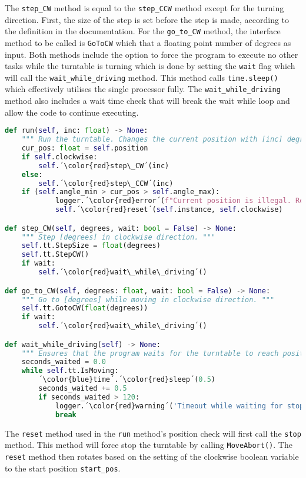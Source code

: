 The \verb+step_CW+ method is equal to the \verb+step_CCW+ method except for the turning direction. First, the size of the step is set before the step is made, according to the definition in the documentation. For the \verb+go_to_CW+ method, the interface method to be called is \verb+GoToCW+ which that a floating point number of degrees as input. Both methods include the option to force the program to execute no other tasks while the turntable is turning which is done by setting the \verb+wait+ flag which will call the \verb+wait_while_driving+ method. This method calls \verb+time.sleep()+ which effectively utilises the single processor fully. The \verb+wait_while_driving+ method also includes a wait time check that will break the wait while loop and allow the code to continue executing. 

\begin{lstlisting}[language=Python, caption=Methods for turning the turntable to the wanted position.]
def run(self, inc: float) -> None:
    """ Run the turntable. Changes the current position with [inc] degrees. """
    cur_pos: float = self.position
    if self.clockwise:
        self.´\color{red}step\_CW´(inc)
    else:
        self.´\color{red}step\_CCW´(inc)
    if (self.angle_min > cur_pos > self.angle_max):
            logger.´\color{red}error´(f"Current position is illegal. Resetting: {self.instance}")
            self.´\color{red}reset´(self.instance, self.clockwise)

def step_CW(self, degrees, wait: bool = False) -> None:
    """ Step [degrees] in clockwise direction. """
    self.tt.StepSize = float(degrees)
    self.tt.StepCW()
    if wait:
        self.´\color{red}wait\_while\_driving´()

def go_to_CW(self, degrees: float, wait: bool = False) -> None:
    """ Go to [degrees] while moving in clockwise direction. """
    self.tt.GotoCW(float(degrees))
    if wait:
        self.´\color{red}wait\_while\_driving´()

def wait_while_driving(self) -> None:
    """ Ensures that the program waits for the turntable to reach position before execution further code. """
    seconds_waited = 0.0
    while self.tt.IsMoving:
        ´\color{blue}time´.´\color{red}sleep´(0.5)
        seconds_waited += 0.5
        if seconds_waited > 120:
            logger.´\color{red}warning´('Timeout while waiting for stop.')
            break
\end{lstlisting}

The \verb+reset+ method used in the \verb+run+ method's position check will first call the \verb+stop+ method. This method will force stop the turntable by calling \verb+MoveAbort()+. The \verb+reset+ method then rotates based on the setting of the clockwise boolean variable to the start position \verb+start_pos+.

